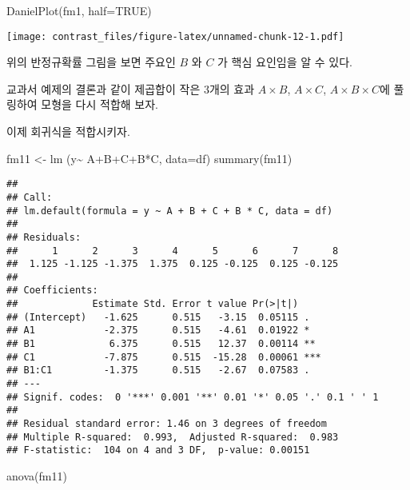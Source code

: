 \documentclass[
]{book}
\newenvironment{Shaded}{\begin{snugshade}}{\end{snugshade}}
\newcommand{\AttributeTok}[1]{\textcolor[rgb]{0.77,0.63,0.00}{#1}}
\newcommand{\ConstantTok}[1]{\textcolor[rgb]{0.00,0.00,0.00}{#1}}
\newcommand{\FunctionTok}[1]{\textcolor[rgb]{0.00,0.00,0.00}{#1}}
\newcommand{\NormalTok}[1]{#1}
\newcommand{\OtherTok}[1]{\textcolor[rgb]{0.56,0.35,0.01}{#1}}
\newcommand{\SpecialCharTok}[1]{\textcolor[rgb]{0.00,0.00,0.00}{#1}}
\begin{document}
\begin{Shaded}
\begin{Highlighting}[]
\FunctionTok{DanielPlot}\NormalTok{(fm1, }\AttributeTok{half=}\ConstantTok{TRUE}\NormalTok{)}
\end{Highlighting}
\end{Shaded}

\texttt{[image: contrast\_files/figure-latex/unnamed-chunk-12-1.pdf]}

위의 반정규확률 그림을 보면 주요인 \(B\) 와 \(C\) 가 핵심 요인임을 알 수 있다.

교과서 예제의 결론과 같이 제곱합이 작은 3개의 효과 \(A \times B\), \(A \times C\), \(A \times B \times C\)에 풀링하여 모형을 다시 적합해 보자.

이제 회귀식을 적합시키자.

\begin{Shaded}
\begin{Highlighting}[]
\NormalTok{fm11 }\OtherTok{\textless{}{-}} \FunctionTok{lm}\NormalTok{ (y}\SpecialCharTok{\textasciitilde{}}\NormalTok{ A}\SpecialCharTok{+}\NormalTok{B}\SpecialCharTok{+}\NormalTok{C}\SpecialCharTok{+}\NormalTok{B}\SpecialCharTok{*}\NormalTok{C, }\AttributeTok{data=}\NormalTok{df) }
\FunctionTok{summary}\NormalTok{(fm11)}
\end{Highlighting}
\end{Shaded}

\begin{verbatim}
## 
## Call:
## lm.default(formula = y ~ A + B + C + B * C, data = df)
## 
## Residuals:
##      1      2      3      4      5      6      7      8 
##  1.125 -1.125 -1.375  1.375  0.125 -0.125  0.125 -0.125 
## 
## Coefficients:
##             Estimate Std. Error t value Pr(>|t|)    
## (Intercept)   -1.625      0.515   -3.15  0.05115 .  
## A1            -2.375      0.515   -4.61  0.01922 *  
## B1             6.375      0.515   12.37  0.00114 ** 
## C1            -7.875      0.515  -15.28  0.00061 ***
## B1:C1         -1.375      0.515   -2.67  0.07583 .  
## ---
## Signif. codes:  0 '***' 0.001 '**' 0.01 '*' 0.05 '.' 0.1 ' ' 1
## 
## Residual standard error: 1.46 on 3 degrees of freedom
## Multiple R-squared:  0.993,  Adjusted R-squared:  0.983 
## F-statistic:  104 on 4 and 3 DF,  p-value: 0.00151
\end{verbatim}

\begin{Shaded}
\begin{Highlighting}[]
\FunctionTok{anova}\NormalTok{(fm11)}
\end{Highlighting}
\end{Shaded}
\end{document}
